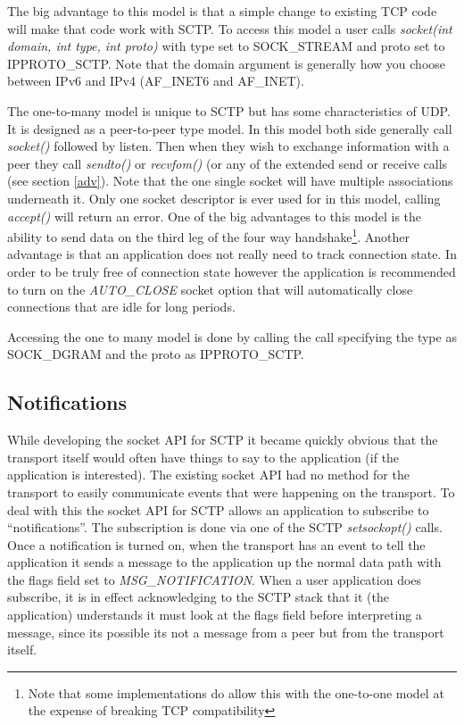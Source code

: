 \documentclass[conference]{IEEEtran}
\begin{document}
The big advantage to this model is that a simple change to 
existing TCP code will make that code work with SCTP. To access this model a user
calls \emph{socket(int domain,  int type, int proto)}
with type set to SOCK\_STREAM and proto set to IPPROTO\_SCTP. 
Note that the domain argument is generally how you choose between IPv6 
and IPv4 (AF\_INET6 and AF\_INET).

The one-to-many model is unique to SCTP but has some characteristics of UDP.
It is designed as a peer-to-peer type model.  In this model both side generally
call \emph{socket()} followed by listen. Then when they wish to exchange information
with a peer they call \emph{sendto()} or \emph{recvfom()} (or any of the extended send or receive
calls (see section \ref{adv}). Note that the one single  socket will have multiple
associations underneath it. Only one socket descriptor is ever used for
in this model, calling \emph{accept()} will return an error. One of the big advantages to this model is the
ability to send data on the third leg of the four way handshake\footnote{Note that some 
implementations do allow this with the one-to-one model at the expense of
breaking TCP compatibility}. Another advantage is that an application does not
really need to track connection state. In order to be truly free of connection
state however the application is recommended to turn on the \emph{AUTO\_CLOSE} socket option
that will automatically close connections that are idle for long periods. 

Accessing the one to many model is done by calling the call specifying the type as
SOCK\_DGRAM and the proto as IPPROTO\_SCTP.

\subsection{Notifications}

While developing the socket API for SCTP it became quickly obvious
that the transport itself would often have things to say to the application 
(if the application is interested). The existing socket API had no method
for the transport to easily communicate events that were happening
on the transport. To deal with this the socket API for SCTP allows an
application to subscribe to ``notifications''. The subscription is
done via one of the SCTP \emph{setsockopt()} calls. Once a
notification is turned on, when the transport has an event to tell
the application it sends a message to the application up the normal
data path with the flags field set to \emph{MSG\_NOTIFICATION}. When a
user application does subscribe, it is in effect acknowledging to the SCTP stack
that it (the application) understands it must look at the flags field before interpreting
a message, since its possible its not a message from a peer but from the transport
itself.
\end{document}
